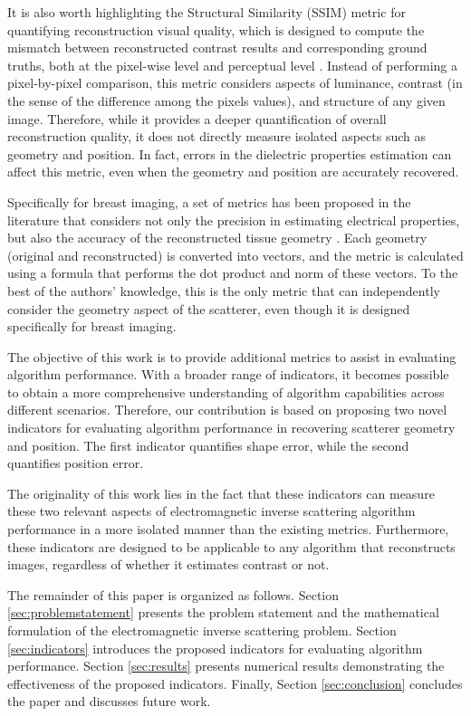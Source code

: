 \documentclass{ieeeaccess}
\begin{document}
    It is also worth highlighting the Structural Similarity (SSIM) metric \cite{wang2004image} for quantifying reconstruction visual quality, which is designed to compute the mismatch between reconstructed contrast results and corresponding ground truths, both at the pixel-wise level and perceptual level \cite{wang2023push,liu2025exploring}. Instead of performing a pixel-by-pixel comparison, this metric considers aspects of luminance, contrast (in the sense of the difference among the pixels values), and structure of any given image. Therefore, while it provides a deeper quantification of overall reconstruction quality, it does not directly measure isolated aspects such as geometry and position. In fact, errors in the dielectric properties estimation can affect this metric, even when the geometry and position are accurately recovered.

    Specifically for breast imaging, a set of metrics has been proposed in the literature that considers not only the precision in estimating electrical properties, but also the accuracy of the reconstructed tissue geometry \cite{kurrant2021evaluating}. Each geometry (original and reconstructed) is converted into vectors, and the metric is calculated using a formula that performs the dot product and norm of these vectors. To the best of the authors' knowledge, this is the only metric that can independently consider the geometry aspect of the scatterer, even though it is designed specifically for breast imaging.

    The objective of this work is to provide additional metrics to assist in evaluating algorithm performance. With a broader range of indicators, it becomes possible to obtain a more comprehensive understanding of algorithm capabilities across different scenarios. Therefore, our contribution is based on proposing two novel indicators for evaluating algorithm performance in recovering scatterer geometry and position. The first indicator quantifies shape error, while the second quantifies position error. 

    The originality of this work lies in the fact that these indicators can measure these two relevant aspects of electromagnetic inverse scattering algorithm performance in a more isolated manner than the existing metrics. Furthermore, these indicators are designed to be applicable to any algorithm that reconstructs images, regardless of whether it estimates contrast or not.

    The remainder of this paper is organized as follows. Section \ref{sec:problemstatement} presents the problem statement and the mathematical formulation of the electromagnetic inverse scattering problem. Section \ref{sec:indicators} introduces the proposed indicators for evaluating algorithm performance. Section \ref{sec:results} presents numerical results demonstrating the effectiveness of the proposed indicators. Finally, Section \ref{sec:conclusion} concludes the paper and discusses future work.
\end{document}
